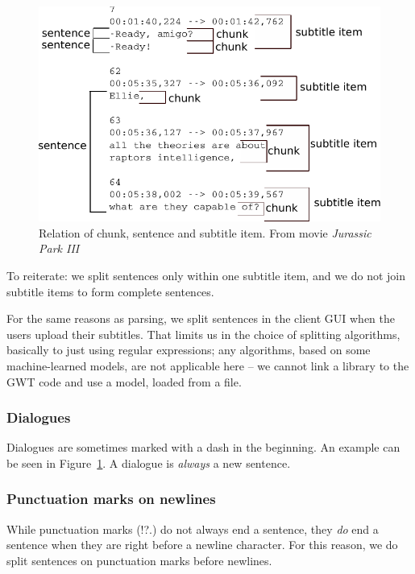 \begin{figure}[t]
\begin{center}
\includegraphics{figures/chunks.pdf}
\end{center}
\caption{Relation of chunk, sentence and subtitle item. From movie \emph{Jurassic Park III}}\label{splitting:chunks}
\end{figure}

To reiterate: we split sentences only within one subtitle item, and we do not join subtitle items to form complete sentences.

For the same reasons as parsing, we split sentences in the client GUI when the users upload their subtitles. That limits us in the choice of splitting algorithms, basically to just using regular expressions; any algorithms, based on some machine-learned models, are not applicable here -- we cannot link a library to the GWT code and use a model, loaded from a file.

\subsubsection*{Dialogues}
Dialogues are sometimes marked with a dash in the beginning. An example can be seen in Figure~\ref{splitting:chunks}. A dialogue is \emph{always} a new sentence.

\subsubsection*{Punctuation marks on newlines}
While punctuation marks (!?.) do not always end a sentence, they \emph{do} end a sentence when they are right before a newline character. For this reason, we do split sentences on punctuation marks before newlines.

